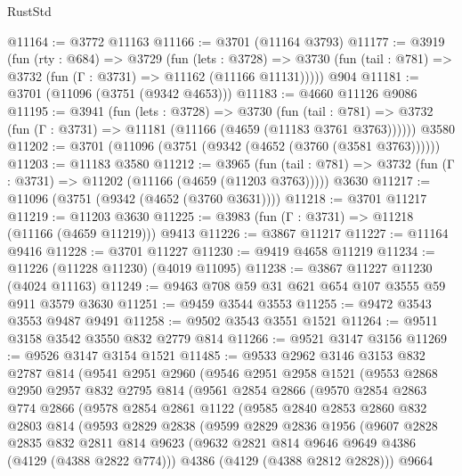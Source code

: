 \begin{lexlean}{RustStd}
\begin{coremodule}
{\begin{coremodule}
{{{{{{{{{{{{{{@11164 := @3772 @11163
@11166 := @3701 (@11164 @3793)
@11177 := @3919
    (fun (rty : @684) =>
    @3729
      (fun (lets : @3728) =>
      @3730 (fun (tail : @781) => @3732 (fun (Γ : @3731) => @11162 (@11166 @11131)))))
    @904
@11181 := @3701 (@11096 (@3751 (@9342 @4653)))
@11183 := @4660 @11126 @9086
@11195 := @3941
    (fun (lets : @3728) =>
    @3730
      (fun (tail : @781) =>
      @3732 (fun (Γ : @3731) => @11181 (@11166 (@4659 (@11183 @3761 @3763))))))
    @3580
@11202 := @3701 (@11096 (@3751 (@9342 (@4652 (@3760 (@3581 @3763))))))
@11203 := @11183 @3580
@11212 := @3965
    (fun (tail : @781) => @3732 (fun (Γ : @3731) => @11202 (@11166 (@4659 (@11203 @3763)))))
    @3630
@11217 := @11096 (@3751 (@9342 (@4652 (@3760 @3631))))
@11218 := @3701 @11217
@11219 := @11203 @3630
@11225 := @3983 (fun (Γ : @3731) => @11218 (@11166 (@4659 @11219))) @9413
@11226 := @3867 @11217
@11227 := @11164 @9416
@11228 := @3701 @11227
@11230 := @9419 @4658 @11219
@11234 := @11226 (@11228 @11230) (@4019 @11095)
@11238 := @3867 @11227 @11230 (@4024 @11163)
@11249 := @9463 @708 @59 @31 @621 @654 @107 @3555 @59 @911 @3579 @3630
@11251 := @9459 @3544 @3553
@11255 := @9472 @3543 @3553 @9487 @9491
@11258 := @9502 @3543 @3551 @1521
@11264 := @9511 @3158 @3542 @3550 @832 @2779 @814
@11266 := @9521 @3147 @3156
@11269 := @9526 @3147 @3154 @1521
@11485 := @9533
    @2962
    @3146
    @3153
    @832
    @2787
    @814
    (@9541
      @2951
      @2960
      (@9546
        @2951
        @2958
        @1521
        (@9553
          @2868
          @2950
          @2957
          @832
          @2795
          @814
          (@9561
            @2854
            @2866
            (@9570
              @2854
              @2863
              @774
              @2866
              (@9578
                @2854
                @2861
                @1122
                (@9585
                  @2840
                  @2853
                  @2860
                  @832
                  @2803
                  @814
                  (@9593
                    @2829
                    @2838
                    (@9599
                      @2829
                      @2836
                      @1956
                      (@9607
                        @2828
                        @2835
                        @832
                        @2811
                        @814
                        @9623
                        (@9632 @2821 @814 @9646 @9649 @4386 (@4129 (@4388 @2822 @774)))
                        @4386
                        (@4129 (@4388 @2812 @2828)))
                      @9664
}}}}}}}}}}}}}}
\end{coremodule}}
\end{coremodule}
\end{lexlean}
